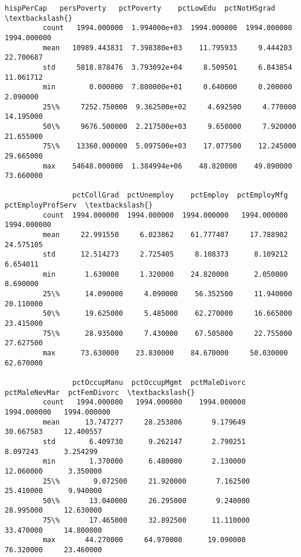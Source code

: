 \documentclass[11pt]{llncs}
\begin{document}
\begin{Verbatim}[commandchars=\\\{\}]
                  hispPerCap   persPoverty   pctPoverty    pctLowEdu  pctNotHSgrad  \textbackslash{}
         count   1994.000000  1.994000e+03  1994.000000  1994.000000   1994.000000   
         mean   10989.443831  7.398380e+03    11.795933     9.444203     22.700687   
         std     5818.878476  3.793092e+04     8.509501     6.843854     11.061712   
         min        0.000000  7.800000e+01     0.640000     0.200000      2.090000   
         25\%     7252.750000  9.362500e+02     4.692500     4.770000     14.195000   
         50\%     9676.500000  2.217500e+03     9.650000     7.920000     21.655000   
         75\%    13360.000000  5.097500e+03    17.077500    12.245000     29.665000   
         max    54648.000000  1.384994e+06    48.820000    49.890000     73.660000   
         
                pctCollGrad  pctUnemploy    pctEmploy  pctEmployMfg  pctEmployProfServ  \textbackslash{}
         count  1994.000000  1994.000000  1994.000000   1994.000000        1994.000000   
         mean     22.991550     6.023862    61.777407     17.788902          24.575105   
         std      12.514273     2.725405     8.108373      8.109212           6.654011   
         min       1.630000     1.320000    24.820000      2.050000           8.690000   
         25\%      14.090000     4.090000    56.352500     11.940000          20.110000   
         50\%      19.625000     5.485000    62.270000     16.665000          23.415000   
         75\%      28.935000     7.430000    67.505000     22.755000          27.627500   
         max      73.630000    23.830000    84.670000     50.030000          62.670000   
         
                pctOccupManu  pctOccupMgmt  pctMaleDivorc  pctMaleNevMar  pctFemDivorc  \textbackslash{}
         count   1994.000000   1994.000000    1994.000000    1994.000000   1994.000000   
         mean      13.747277     28.253806       9.179649      30.667583     12.400557   
         std        6.409730      9.262147       2.790251       8.097243      3.254299   
         min        1.370000      6.480000       2.130000      12.060000      3.350000   
         25\%        9.072500     21.920000       7.162500      25.410000      9.940000   
         50\%       13.040000     26.295000       9.240000      28.995000     12.630000   
         75\%       17.465000     32.892500      11.110000      33.470000     14.800000   
         max       44.270000     64.970000      19.090000      76.320000     23.460000   
         

\end{Verbatim}
\end{document}
